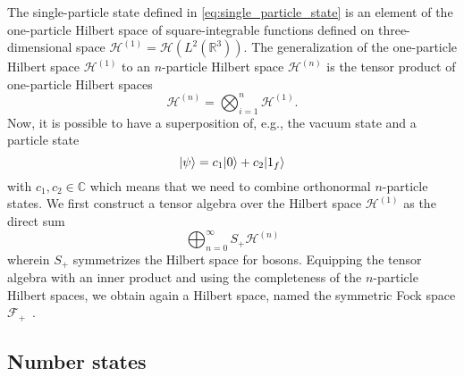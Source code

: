 The single-particle state defined in \cref{eq:single_particle_state} is an element of the one-particle Hilbert space of square-integrable functions defined on three-dimensional space $\mathcal{H}^{(1)}=\mathcal{H}\left(L^2(\mathbb{R}^3)\right)$.
The generalization of the one-particle Hilbert space $\mathcal{H}^{(1)}$ to an $n$-particle Hilbert space $\mathcal{H}^{(n)}$ is the tensor product of one-particle Hilbert spaces
\begin{equation}
	\mathcal{H}^{(n)}
	=
	\bigotimes^n_{i=1}
	\mathcal{H}^{(1)}
	.
\end{equation}
Now, it is possible to have a superposition of, e.g., the vacuum state and a particle state
\begin{equation}
	\ket{\psi}
	=
	c_1
	\vacket
	+
	c_2
	\ket{1_f}
\end{equation}
with $c_1,c_2\in\mathbb{C}$ which means that we need to combine orthonormal $n$-particle states.
We first construct a tensor algebra over the Hilbert space $\mathcal{H}^{(1)}$ as the direct sum~\cite[p.~290]{Bogolubov1989}
\begin{equation}
	\bigoplus^\infty_{n=0}
	S_+
	\mathcal{H}^{(n)}
\end{equation}
wherein $S_+$ symmetrizes the Hilbert space for bosons.
Equipping the tensor algebra with an inner product and using the completeness of the $n$-particle Hilbert spaces, we obtain again a Hilbert space, named the symmetric Fock space $\mathcal{F}_+$~\cite[p.~35]{Haag2012}.

\subsection{Number states}

